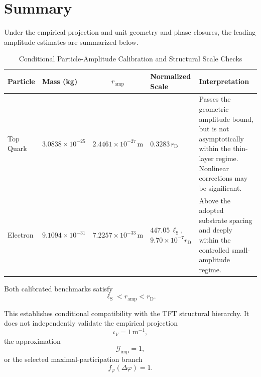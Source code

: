 \section{Summary}

Under the empirical projection and unit geometry and phase closures, the leading amplitude estimates are summarized below.

\begin{table}[H]
\centering
\caption{Conditional Particle-Amplitude Calibration and Structural Scale Checks}
\vspace{0.2cm}
\label{tab:particle_amplitudes}
\renewcommand{\arraystretch}{1.5}
\setlength{\tabcolsep}{4pt}
\small
\begin{tabular}{@{}llclp{}@{}}
\toprule
\textbf{Particle} &
\textbf{Mass (kg)} &
\textbf{$r_{\mathrm{amp}}$} &
\textbf{Normalized Scale} &
\textbf{Interpretation} \\
\midrule

Top Quark &
$3.0838\times10^{-25}$ &
$2.4461\times10^{-27}\,\mathrm{m}$ &
$0.3283\,r_{\mathrm{D}}$ &
Passes the geometric amplitude bound, but is not asymptotically within the thin-layer regime. Nonlinear corrections may be significant. \\

Electron &
$9.1094\times10^{-31}$ &
$7.2257\times10^{-33}\,\mathrm{m}$ &
$447.05\,\ell_{\mathrm{S}}$, $9.70\times10^{-7}r_{\mathrm{D}}$ &
Above the adopted substrate spacing and deeply within the controlled small-amplitude regime. \\

\bottomrule
\end{tabular}
\end{table}

Both calibrated benchmarks satisfy
\begin{equation}
    \ell_{\mathrm{S}} < r_{\mathrm{amp}} < r_{\mathrm{D}}.
\end{equation}

This establishes conditional compatibility with the TFT structural hierarchy. It does not independently validate the empirical projection
\begin{equation}
    \iota_V = 1\,\mathrm{m}^{-1},
\end{equation}
the approximation
\begin{equation}
    \mathcal{G}_{\mathrm{imp}} = 1,
\end{equation}
or the selected maximal-participation branch
\begin{equation}
    f_{\varphi}(\Delta\varphi) = 1.
\end{equation}

